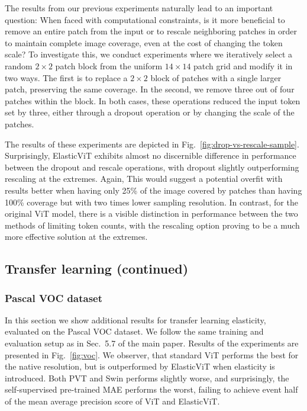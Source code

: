 \documentclass[10pt,twocolumn,letterpaper]{article}
\newcommand{\ours}[0]{ElasticViT\xspace}
\begin{document}
The results from our previous experiments naturally lead to an important question: When faced with computational constraints, is it more beneficial to remove an entire patch from the input or to rescale neighboring patches in order to maintain complete image coverage, even at the cost of changing the token scale? To investigate this, we conduct experiments where we iteratively select a random $2\times2$ patch block from the uniform $14\times14$ patch grid and modify it in two ways. The first is to replace a $2\times2$ block of patches with a single larger patch, preserving the same coverage. In the second, we remove three out of four patches within the block. In both cases, these operations reduced the input token set by three, either through a dropout operation or by changing the scale of the patches.

 

The results of these experiments are depicted in Fig.~\ref{fig:drop-vs-rescale-sample}. Surprisingly, ElasticViT exhibits almost no discernible difference in performance between the dropout and rescale operations, with dropout slightly outperforming rescaling at the extremes. Again, This would suggest a potential overfit with results better when having only 25\% of the image covered by patches than having 100\% coverage but with two times lower sampling resolution. In contrast, for the original ViT model, there is a visible distinction in performance between the two methods of limiting token counts, with the rescaling option proving to be a much more effective solution at the extremes.



\subsection{Transfer learning (continued)}

\subsubsection{Pascal VOC dataset}

In this section we show additional results for transfer learning elasticity, evaluated on the Pascal VOC dataset. We follow the same training and evaluation setup as in Sec.~5.7 of the main paper. Results of the experiments are presented in Fig.~\ref{fig:voc}. We observer, that standard ViT performs the best for the native resolution, but is outperformed by \ours{} when elasticity is introduced. Both PVT and Swin performs slightly worse, and surprisingly, the self-supervised pre-trained MAE performs the worst, failing to achieve event half of the mean average precision score of ViT and \ours{}.
\end{document}
